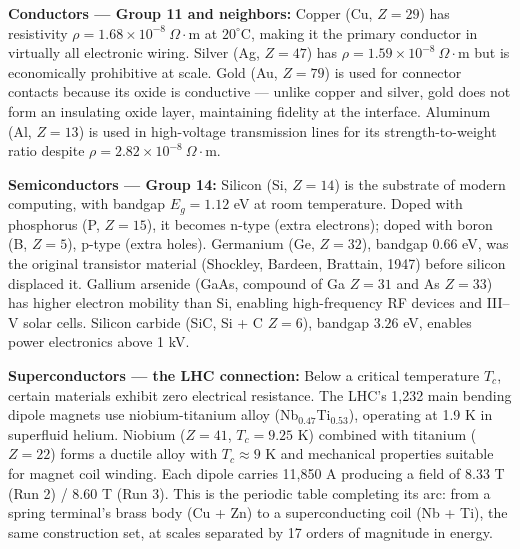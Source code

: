 \documentclass[11pt,letterpaper]{article}
\begin{document}
\textbf{Conductors --- Group 11 and neighbors:}
Copper (Cu, $Z=29$) has resistivity $\rho = 1.68 \times 10^{-8}\ \Omega\cdot\text{m}$ at
$20^\circ$C, making it the primary conductor in virtually all electronic wiring. Silver (Ag, $Z=47$)
has $\rho = 1.59 \times 10^{-8}\ \Omega\cdot\text{m}$ but is economically prohibitive at scale. Gold
(Au, $Z=79$) is used for connector contacts because its oxide is conductive --- unlike copper and
silver, gold does not form an insulating oxide layer, maintaining fidelity at the interface.
Aluminum (Al, $Z=13$) is used in high-voltage transmission lines for its strength-to-weight ratio
despite $\rho = 2.82 \times 10^{-8}\ \Omega\cdot\text{m}$.

\textbf{Semiconductors --- Group 14:}
Silicon (Si, $Z=14$) is the substrate of modern computing, with bandgap $E_g = 1.12$ eV at room
temperature. Doped with phosphorus (P, $Z=15$), it becomes n-type (extra electrons); doped with
boron (B, $Z=5$), p-type (extra holes). Germanium (Ge, $Z=32$), bandgap $0.66$ eV, was the
original transistor material (Shockley, Bardeen, Brattain, 1947) before silicon displaced it.
Gallium arsenide (GaAs, compound of Ga $Z=31$ and As $Z=33$) has higher electron mobility than
Si, enabling high-frequency RF devices and III--V solar cells. Silicon carbide (SiC, Si + C $Z=6$),
bandgap $3.26$ eV, enables power electronics above 1 kV.

\textbf{Superconductors --- the LHC connection:}
Below a critical temperature $T_c$, certain materials exhibit zero electrical resistance.
The LHC's 1,232 main bending dipole magnets use niobium-titanium alloy (Nb$_{0.47}$Ti$_{0.53}$),
operating at 1.9 K in superfluid helium. Niobium ($Z=41$, $T_c = 9.25$ K) combined with titanium
($Z=22$) forms a ductile alloy with $T_c \approx 9$ K and mechanical properties suitable for magnet
coil winding. Each dipole carries 11,850 A producing a field of 8.33 T (Run 2) / 8.60 T (Run 3).
This is the periodic table completing its arc: from a spring terminal's brass body (Cu + Zn) to
a superconducting coil (Nb + Ti), the same construction set, at scales separated by 17 orders of
magnitude in energy.
\end{document}
